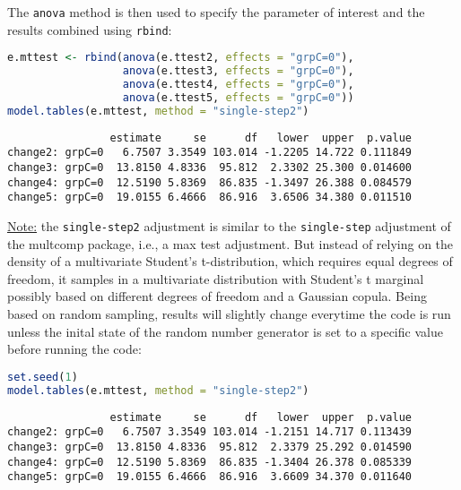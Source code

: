 \documentclass[12pt]{article}
\begin{document}
\noindent The \texttt{anova} method is then used to specify the parameter of
 interest and the results combined using \texttt{rbind}:
\begin{lstlisting}[language=r,numbers=none]
e.mttest <- rbind(anova(e.ttest2, effects = "grpC=0"),
                  anova(e.ttest3, effects = "grpC=0"),
                  anova(e.ttest4, effects = "grpC=0"),
                  anova(e.ttest5, effects = "grpC=0"))
model.tables(e.mttest, method = "single-step2")
\end{lstlisting}

\label{}
\begin{verbatim}
                estimate     se      df   lower  upper  p.value
change2: grpC=0   6.7507 3.3549 103.014 -1.2205 14.722 0.111849
change3: grpC=0  13.8150 4.8336  95.812  2.3302 25.300 0.014600
change4: grpC=0  12.5190 5.8369  86.835 -1.3497 26.388 0.084579
change5: grpC=0  19.0155 6.4666  86.916  3.6506 34.380 0.011510
\end{verbatim}


\uline{Note:} the \texttt{single-step2} adjustment is similar to the \texttt{single-step}
adjustment of the multcomp package, i.e., a max test adjustment. But
instead of relying on the density of a multivariate Student's
t-distribution, which requires equal degrees of freedom, it samples in
a multivariate distribution with Student's t marginal possibly based
on different degrees of freedom and a Gaussian copula. Being based on
random sampling, results will slightly change everytime the code is
run unless the inital state of the random number generator is set to a
specific value before running the code:

\begin{lstlisting}[language=r,numbers=none]
set.seed(1)
model.tables(e.mttest, method = "single-step2")
\end{lstlisting}

\label{}
\begin{verbatim}
                estimate     se      df   lower  upper  p.value
change2: grpC=0   6.7507 3.3549 103.014 -1.2151 14.717 0.113439
change3: grpC=0  13.8150 4.8336  95.812  2.3379 25.292 0.014590
change4: grpC=0  12.5190 5.8369  86.835 -1.3404 26.378 0.085339
change5: grpC=0  19.0155 6.4666  86.916  3.6609 34.370 0.011640
\end{verbatim}
\end{document}
